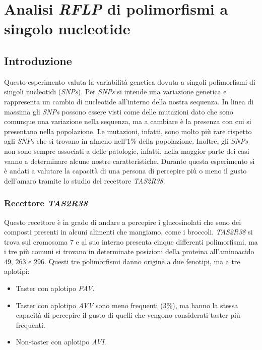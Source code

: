 \section*{Analisi \emph{RFLP} di polimorfismi a singolo nucleotide}

	\subsection*{Introduzione}
	Questo esperimento valuta la variabilità genetica dovuta a singoli polimorfismi di singoli nucleotidi (\emph{SNPs}). 
	Per \emph{SNPs} si intende una variazione genetica e rappresenta un cambio di nucleotide all'interno della nostra sequenza. 
	In linea di massima gli \emph{SNPs} possono essere visti come delle mutazioni dato che sono comunque una variazione nella sequenza, ma a cambiare è la presenza con cui si presentano nella popolazione. 
	Le mutazioni, infatti, sono molto più rare  rispetto agli \emph{SNPs} che si trovano in almeno nell'$1\%$ della popolazione. 
	Inoltre, gli \emph{SNPs} non sono sempre associati a delle patologie, infatti, nella maggior parte dei casi vanno a determinare alcune nostre caratteristiche. 
	Durante questa esperimento si è andati a valutare la capacità di una persona di percepire più o meno il gusto dell'amaro tramite lo studio del recettore \emph{TAS2R38}.
		
		\subsubsection*{Recettore \emph{TAS2R38}}
		Questo recettore è in grado di andare a percepire i glucosinolati che sono dei composti presenti in alcuni alimenti che mangiamo, come i broccoli. 
		\emph{TAS2R38} si trova sul cromosoma $7$ e al suo interno presenta cinque differenti polimorfismi, ma i tre più comuni si trovano in determinate posizioni della proteina all'aminoacido $49$, $263$ e $296$. 
		Questi tre polimorfismi danno origine a due fenotipi, ma a tre aplotipi:
		\begin{multicols}{2}
		\begin{itemize}
			\item Taster con aplotipo \emph{PAV}.
			\item Taster con aplotipo \emph{AVV} sono meno frequenti ($3\%$), ma hanno la stessa capacità di percepire il gusto di quelli che vengono considerati taster più frequenti.
			\item Non-taster con aplotipo \emph{AVI}. 
		\end{itemize}
		\end{multicols}
    
